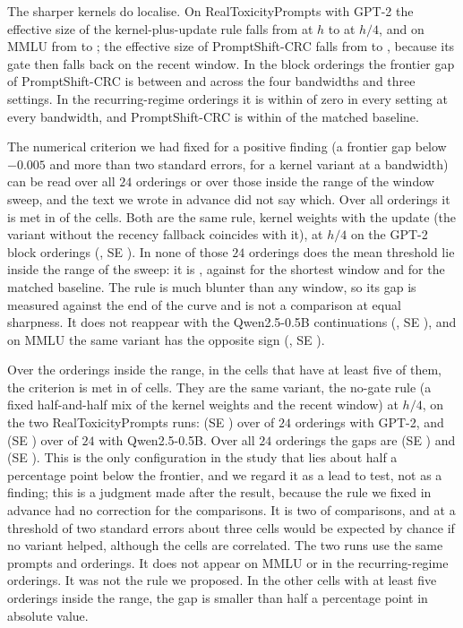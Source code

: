 The sharper kernels do localise. On RealToxicityPrompts with GPT-2 the effective size of the kernel-plus-update rule falls from \BwKUNeffOneRtp{} at $h$ to \BwKUNeffQuarterRtp{} at $h/4$, and on MMLU from \BwKUNeffOneMmlu{} to \BwKUNeffQuarterMmlu{}; the effective size of PromptShift-CRC falls from \BwPSNeffOne{} to \BwPSNeffQuarter{}, because its gate then falls back on the recent window. In the block orderings the frontier gap of PromptShift-CRC is between \BwPSSweepLo{} and \BwPSSweepHi{} across the four bandwidths and three settings. In the recurring-regime orderings it is within \BwPSRecurMaxGap{} of zero in every setting at every bandwidth, and PromptShift-CRC is within \BwPSRecurMaxMatched{} of the matched baseline.

The numerical criterion we had fixed for a positive finding (a frontier gap below $-0.005$ and more than two standard errors, for a kernel variant at a bandwidth) can be read over all $24$ orderings or over those inside the range of the window sweep, and the text we wrote in advance did not say which. Over all orderings it is met in \BwPass{} of the \BwCells{} cells. Both are the same rule, kernel weights with the update (the variant without the recency fallback coincides with it), at $h/4$ on the GPT-2 block orderings (\BwPassGap{}, SE \BwPassSE{}). In none of those $24$ orderings does the mean threshold lie inside the range of the sweep: it is \BwPassThr{}, against \BwShortThr{} for the shortest window and \BwMatchedThr{} for the matched baseline. The rule is much blunter than any window, so its gap is measured against the end of the curve and is not a comparison at equal sharpness. It does not reappear with the Qwen2.5-0.5B continuations (\BwKUQuarterQwenGap{}, SE \BwKUQuarterQwenSE{}), and on MMLU the same variant has the opposite sign (\BwKUQuarterMmluGap{}, SE \BwKUQuarterMmluSE{}).

Over the orderings inside the range, in the cells that have at least five of them, the criterion is met in \BwInsidePass{} of \BwInsideCells{} cells. They are the same variant, the no-gate rule (a fixed half-and-half mix of the kernel weights and the recent window) at $h/4$, on the two RealToxicityPrompts runs: \BwLeadGptTwoIn{} (SE \BwLeadGptTwoInSE{}) over \BwLeadGptTwoInN{} of $24$ orderings with GPT-2, and \BwLeadQwenIn{} (SE \BwLeadQwenInSE{}) over \BwLeadQwenInN{} of $24$ with Qwen2.5-0.5B. Over all $24$ orderings the gaps are \BwLeadGptTwoAll{} (SE \BwLeadGptTwoAllSE{}) and \BwLeadQwenAll{} (SE \BwLeadQwenAllSE{}). This is the only configuration in the study that lies about half a percentage point below the frontier, and we regard it as a lead to test, not as a finding; this is a judgment made after the result, because the rule we fixed in advance had no correction for the \BwInsideCells{} comparisons. It is two of \BwInsideCells{} comparisons, and at a threshold of two standard errors about three cells would be expected by chance if no variant helped, although the cells are correlated. The two runs use the same prompts and orderings. It does not appear on MMLU or in the recurring-regime orderings. It was not the rule we proposed. In the other cells with at least five orderings inside the range, the gap is smaller than half a percentage point in absolute value.

